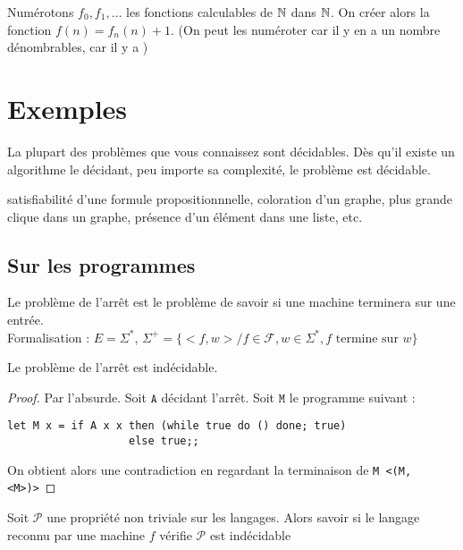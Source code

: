 \begin{example}
	Numérotons $f_0, f_1, \dots$ les fonctions calculables de $\mathbb{N}$ dans $\mathbb{N}$. On créer alors la fonction $f(n) = f_n(n)+1$. (On peut les numéroter car il y en a un nombre dénombrables, car il y a )
\end{example}

\section{Exemples}

La plupart des problèmes que vous connaissez sont décidables. Dès qu'il existe un algorithme le décidant, peu importe sa complexité, le problème est décidable.

\begin{example}
	satisfiabilité d'une formule propositionnnelle, coloration d'un graphe, plus grande clique dans un graphe, présence d'un élément dans une liste, etc.
\end{example}

\subsection{Sur les programmes}

\begin{definition}
	Le problème de l'arrêt est le problème de savoir si une machine terminera sur une entrée.\\
	
	Formalisation : $E = \Sigma^*$, $\Sigma^+ = \{<f, w> / f \in \mathcal F, w\in \Sigma^*, f\text{ termine sur }w\}$
\end{definition}

\begin{theorem}
	Le problème de l'arrêt est indécidable.
\end{theorem}

\begin{proof}
	Par l'absurde. Soit $\texttt{A}$ décidant l'arrêt. Soit $\texttt{M}$ le programme suivant :
	\begin{lstlisting}		
let M x = if A x x then (while true do () done; true)
                   else true;;
\end{lstlisting}
	On obtient alors une contradiction en regardant la terminaison de \texttt{M <(M, <M>)>}
\end{proof}

\begin{theorem}
	Soit $\mathcal P$ une propriété non triviale sur les langages. Alors savoir si le langage reconnu par une machine $f$ vérifie $\mathcal P$ est indécidable
\end{theorem}

